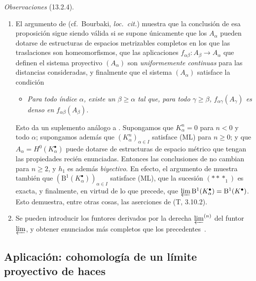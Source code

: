 \begin{env}[13.2.4]
\label{0.13.2.4}
\label{0.13.2.4-fr}
\emph{Observaciones} (13.2.4).
\begin{enumerate}
  \item[{\rm(i)}]
  El argumento de 
  (cf.\ Bourbaki, \emph{loc.\ cit.}) muestra que la conclusión de
  esa proposición sigue siendo válida si se supone únicamente que los
  $A_\alpha$ pueden dotarse de estructuras de espacios metrizables completos
  en los que las traslaciones son homeomorfismos, que las aplicaciones
  $f_{\alpha\beta}:A_\beta\to A_\alpha$ que definen el sistema proyectivo $(A_\alpha)$ son \emph{uniformemente continuas} para las distancias consideradas, y finalmente que el sistema $(A_\alpha)$ satisface la condición
  \begin{itemize}
    \item[(ML$'$)]
    \emph{Para todo índice $\alpha$, existe un $\beta\geq\alpha$ tal
    que, para todo $\gamma\geq\beta$,
    $f_{\alpha\gamma}(A_\gamma)$ es denso en
    $f_{\alpha\beta}(A_\beta)$.}
  \end{itemize}

  Esto da un suplemento análogo a .
  Supongamos que $K_\alpha^n=0$ para $n<0$ y todo $\alpha$; supongamos además que $(K_\alpha^n)_{\alpha\in I}$ satisface (ML) para
  $n\geq0$; y que
  $A_\alpha=H^0(K_\alpha^\bullet)$ puede dotarse de
  estructuras de espacio métrico que tengan las propiedades recién enunciadas.
  Entonces las conclusiones de  no cambian para
  $n\geq2$, y $h_1$ es además \emph{biyectivo}.
  En efecto, el argumento de  muestra también que
  $(\mathrm B^1(K_\alpha^\bullet))_{\alpha\in I}$
  satisface (ML), que la sucesión $(***_1)$ es exacta, y finalmente, en virtud de lo que precede, que $\varprojlim\mathrm B^1(K_\alpha^\bullet)=\mathrm B^1(K^\bullet)$.
  Esto demuestra, entre otras cosas, las aserciones de (T, 3.10.2).

  \item[{\rm(ii)}]
  Se pueden introducir los funtores derivados por la derecha
  $\varprojlim^{(n)}$ del funtor $\varprojlim$, y obtener enunciados más
  completos que los precedentes~\cite{III-28}.
\end{enumerate}
\end{env}

\subsection{Aplicación: cohomología de un límite proyectivo de haces}
\label{subsection:0.13.3}
\label{subsection:0.13.3-fr}

